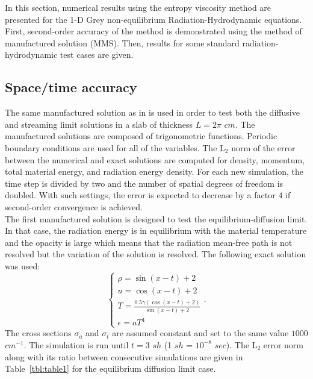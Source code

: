\documentclass[review]{elsarticle}
\newcommand{\tbl}[1]{Table~\ref{#1}}                     %
\begin{document}
In this section, numerical results using the entropy viscosity method are presented for the 1-D Grey non-equilibrium Radiation-Hydrodynamic equations. First, second-order accuracy of the method is demonstrated using the method of manufactured solution (MMS). Then, results for some standard radiation-hydrodynamic test cases are given. 

\subsection{Space/time accuracy}
\label{sec:MMS}

The same manufactured solution as in \cite{EdwardsMorelLowrie} is used in order to test both the diffusive and streaming limit solutions in a slab of thickness $L=2 \pi$ $cm$. The manufactured solutions are composed of trigonometric functions. Periodic boundary conditions are used for all of the variables. The L$_2$ norm of the error between the numerical and exact solutions are computed for density, momentum, total material energy, and radiation energy density. For each new simulation, the time step is divided by two and the  number of spatial degrees of freedom is doubled. With such settings, the error is expected to decrease by a factor $4$ if second-order convergence is achieved. \\
The first manufactured solution is designed to test the equilibrium-diffusion limit. In that case, the radiation energy is in equilibrium with the material temperature and the opacity is large which means that the radiation mean-free path is not resolved but the variation of the solution is resolved. The following exact solution was used:
\begin{equation}
\label{eq:equation13}
\left\{
\begin{array}{llll}
\rho = \sin (x-t)+2 \\
u = \cos(x-t) +2 \\
T = \frac{0.5 \gamma (\cos(x-t) +2) }{\sin (x-t)+2}\\
\epsilon = a T^4
\end{array}
\right. .
\end{equation}
The cross sections $\sigma_a$ and $\sigma_t$ are assumed constant and set to the same value $1000$ $cm^{-1}$. The simulation is run until $t=3$ $sh$
(1 $sh$ = $10^{-8}$ $sec$). The L$_2$ error norm along with its ratio between consecutive simulations are given in \tbl{tbl:table1} for the equilibrium diffusion limit case.
\end{document}
